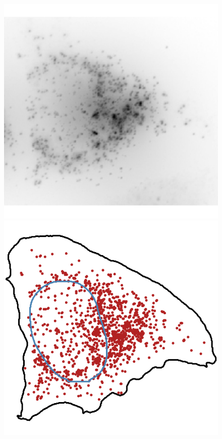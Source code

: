 \begin{figure}[]
		\includegraphics[width=0.95\linewidth]{figures/introduction/real_image_perinuclear}
		\vfill
		\includegraphics[width=0.95\linewidth]{figures/introduction/real_coord_perinuclear}
	\endminipage\hfill

\end{figure}
